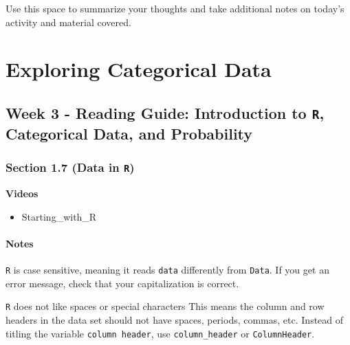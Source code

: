 \documentclass[
]{report}
\providecommand{\tightlist}{%
  \setlength{\itemsep}{0pt}\setlength{\parskip}{0pt}}
\begin{document}
Use this space to summarize your thoughts and take additional notes on today's activity and material covered.

\newpage

\hypertarget{exploring-categorical-data}{%
\chapter{Exploring Categorical Data}\label{exploring-categorical-data}}

\hypertarget{week-3---reading-guide-introduction-to-r-categorical-data-and-probability}{%
\section{\texorpdfstring{Week 3 - Reading Guide: Introduction to \texttt{R}, Categorical Data, and Probability}{Week 3 - Reading Guide: Introduction to R, Categorical Data, and Probability}}\label{week-3---reading-guide-introduction-to-r-categorical-data-and-probability}}

\hypertarget{section-1.7-data-in-r}{%
\subsection*{\texorpdfstring{Section 1.7 (Data in \texttt{R})}{Section 1.7 (Data in R)}}\label{section-1.7-data-in-r}}

\textbf{Videos}

\begin{itemize}
\tightlist
\item
  Starting\_with\_R
\end{itemize}


\hypertarget{notes-3}{%
\subsubsection*{Notes}\label{notes-3}}

\texttt{R} is case sensitive, meaning it reads \texttt{data} differently from \texttt{Data}. If you get an error message, check that your capitalization is correct.

\texttt{R} does not like spaces or special characters This means the column and row headers in the data set should not have spaces, periods, commas, etc. Instead of titling the variable \texttt{column\ header}, use \texttt{column\_header} or \texttt{ColumnHeader}.
\end{document}

